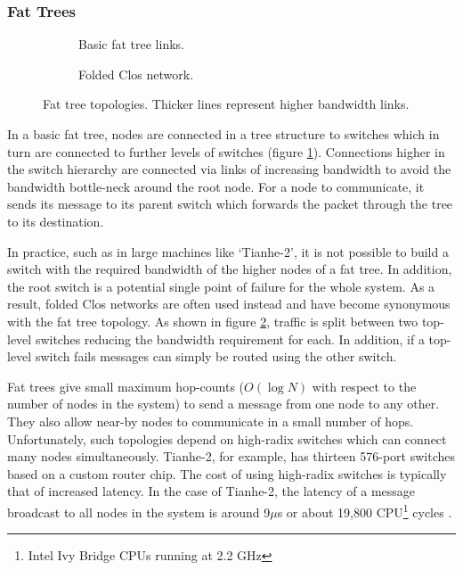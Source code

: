 			\subsubsection{Fat Trees}
				
				\begin{figure}
					\begin{subfigure}[t]{\textwidth}
						\center
						
						\caption{Basic fat tree links.}
						\label{fig:fat-tree-concept}
					\end{subfigure}
					
					\vspace{1.5em}
					
					\begin{subfigure}[t]{\textwidth}
						\center
						
						\caption{Folded Clos network.}
						\label{fig:fat-tree-closs}
					\end{subfigure}
					
					\caption[Fat tree topologies.]{Fat tree topologies. Thicker lines
					represent higher bandwidth links.}
					\label{fig:fat-tree}
				\end{figure}
			
				In a basic fat tree, nodes are connected in a tree structure to switches
				which in turn are connected to further levels of switches (figure
				\ref{fig:fat-tree-concept}). Connections higher in the switch hierarchy
				are connected via links of increasing bandwidth to avoid the bandwidth
				bottle-neck around the root node. For a node to communicate, it
				sends its message to its parent switch which forwards the packet through
				the tree to its destination.
				
				In practice, such as in large machines like `Tianhe-2', it is not
				possible to build a switch with the required bandwidth of the higher
				nodes of a fat tree. In addition, the root switch is a potential single
				point of failure for the whole system. As a result, folded Clos networks
				are often used instead and have become synonymous with the fat tree
				topology. As shown in figure \ref{fig:fat-tree-closs}, traffic is split
				between two top-level switches reducing the bandwidth requirement for
				each. In addition, if a top-level switch fails messages can simply be
				routed using the other switch.
				
				Fat trees give small maximum hop-counts ($O(\log{N})$ with respect to
				the number of nodes in the system) to send a message from one node to
				any other. They also allow near-by nodes to communicate in a small
				number of hops. Unfortunately, such topologies depend on high-radix
				switches which can connect many nodes simultaneously.  Tianhe-2, for
				example, has thirteen 576-port switches based on a custom router chip.
				The cost of using high-radix switches is typically that of increased
				latency. In the case of Tianhe-2, the latency of a message broadcast to
				all nodes in the system is around 9$\mu$s or about 19,800
				CPU\footnote{Intel Ivy Bridge CPUs running at 2.2 GHz} cycles
				\cite{dongarra13}.
				
